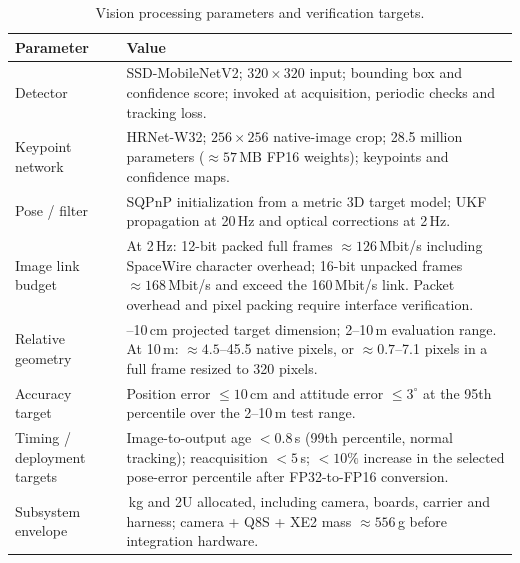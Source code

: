 \documentclass[11pt,a4paper]{article}
\renewcommand{\arraystretch}{1.3}
\begin{document}
\begin{table}[H]
\centering\small
\renewcommand{\arraystretch}{1.45}
\setlength{\tabcolsep}{6pt}
\caption{Vision processing parameters and verification targets.}
\label{tab:ml_cv_performance}
\begin{tabularx}{\linewidth}{|>{\raggedright\arraybackslash}p{3.7cm}|>{\raggedright\arraybackslash}X|}
\hline
\rowcolor{black!8}
\textbf{Parameter} & \textbf{Value} \\
\hline
Detector & SSD-MobileNetV2; $320\times320$ input; bounding box and confidence score; invoked at acquisition, periodic checks and tracking loss. \\
\hline
Keypoint network & HRNet-W32; $256\times256$ native-image crop; 28.5 million parameters ($\approx57$\,MB FP16 weights); keypoints and confidence maps. \\
\hline
Pose / filter & SQPnP initialization from a metric 3D target model; UKF propagation at 20\,Hz and optical corrections at 2\,Hz. \\
\hline
Image link budget & At 2\,Hz: 12-bit packed full frames $\approx126$\,Mbit/s including SpaceWire character overhead; 16-bit unpacked frames $\approx168$\,Mbit/s and exceed the 160\,Mbit/s link. Packet overhead and pixel packing require interface verification. \\
\hline
Relative geometry & 1--10\,cm projected target dimension; 2--10\,m evaluation range. At 10\,m: $\approx4.5$--45.5 native pixels, or $\approx0.7$--7.1 pixels in a full frame resized to 320 pixels. \\
\hline
Accuracy target & Position error $\leq10$\,cm and attitude error $\leq3^{\circ}$ at the 95th percentile over the 2--10\,m test range. \\
\hline
Timing / deployment targets & Image-to-output age $<0.8$\,s (99th percentile, normal tracking); reacquisition $<5$\,s; $<10\%$ increase in the selected pose-error percentile after FP32-to-FP16 conversion. \\
\hline
Subsystem envelope & 1\,kg and 2U allocated, including camera, boards, carrier and harness; camera + Q8S + XE2 mass $\approx556$\,g before integration hardware. \\
\hline
\end{tabularx}
\end{table}
\end{document}
